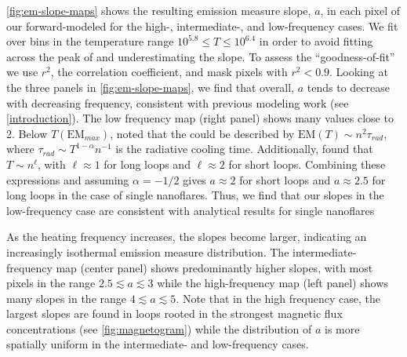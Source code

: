 \autoref{fig:em-slope-maps} shows the resulting emission measure slope, $a$, in each pixel of our forward-modeled \AR{} for the high-, intermediate-, and low-frequency cases. We fit \dem{} over bins in the temperature range $10^{5.8}\le T\le10^{6.4}$ in order to avoid fitting across the peak of \dem{} and underestimating the slope. To assess the ``goodness-of-fit'' we use $r^2$, the correlation coefficient, and mask pixels with $r^2<0.9$. Looking at the three panels in \autoref{fig:em-slope-maps}, we find that overall, $a$ tends to decrease with decreasing frequency, consistent with previous modeling work (see \autoref{introduction}). The low frequency map (right panel) shows many values close to 2. Below $T(\mathrm{EM}_{max})$, \citet{cargill_implications_1994} noted that the \dem{} could be described by $\mathrm{EM}(T)\sim n^2\tau_{rad}$, where $\tau_{rad}\sim T^{1-\alpha}n^{-1}$ is the radiative cooling time. Additionally, \citet{bradshaw_cooling_2010} found that $T\sim n^{\ell}$, with $\ell\approx1$ for long loops and $\ell\approx2$ for short loops. Combining these expressions and assuming $\alpha=-1/2$ \citep[i.e. using the radiative losses of][]{rosner_dynamics_1978} gives $a\approx2$ for short loops and $a\approx2.5$ for long loops in the case of single nanoflares. Thus, we find that our slopes in the low-frequency case are consistent with analytical results for single nanoflares

As the heating frequency increases, the slopes become larger, indicating an increasingly isothermal emission measure distribution. The intermediate-frequency map (center panel) shows predominantly higher slopes, with most pixels in the range $2.5\lesssim a \lesssim 3$ while the high-frequency map (left panel) shows many slopes in the range $4\lesssim a\lesssim5$. Note that in the high frequency case, the largest slopes are found in loops rooted in the strongest magnetic flux concentrations (see \autoref{fig:magnetogram}) while the distribution of $a$ is more spatially uniform in the intermediate- and low-frequency cases.

